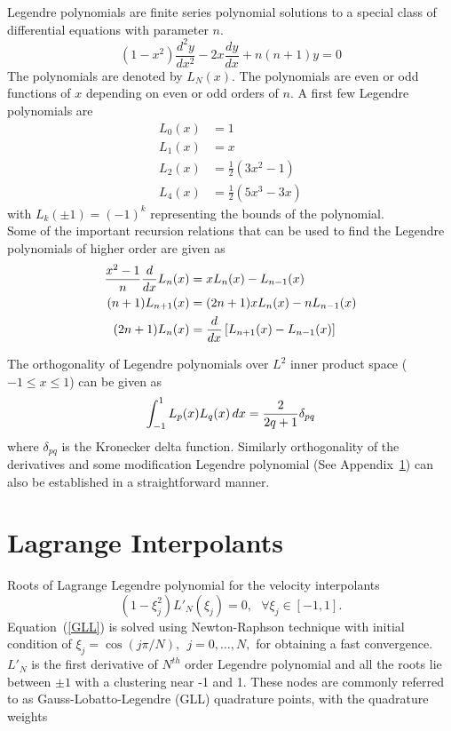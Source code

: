 Legendre polynomials are finite series polynomial solutions to a special class of differential equations with parameter $n$.
\begin{equation}
(1-x^{2})\frac{d^{2}y}{dx^{2}} -2x\frac{dy}{dx} + n(n+1)y = 0
\end{equation}
The polynomials are denoted by $L_{N}(x)$. The polynomials are even or odd functions of $x$ depending on even or odd orders of $n$. A first few Legendre polynomials are 
\begin{align*}
L_{0}(x) & = 1 \\
L_{1}(x) & = x \\
L_{2}(x) & = \frac{1}{2}(3x^2 - 1) \\
L_{4}(x) & = \frac{1}{2}(5x^3 - 3x)
\end{align*}
with $L_k(\pm 1) = (-1)^k$ representing the bounds of the polynomial.\\
Some of the important recursion relations that can be used to find the Legendre polynomials of higher order are given as
\begin{align}
{x^2-1 \over n} {d \over dx} L_n(x) & = xL_n(x) - L_{n-1}(x) \\
(n+1) L_{n+1}(x) & = (2n+1) x L_n(x) - n L_{n-1}(x) \\
(2n+1) L_n(x) & = {d \over dx} \left[ L_{n+1}(x) - L_{n-1}(x) \right]
\end{align}

The orthogonality of Legendre polynomials over $L^{2}$ inner product space ($-1 \le x \le 1$) can be given as
\begin{equation}
\int_{-1}^{1} L_p(x) L_q(x)\,dx = {2 \over {2q + 1}} \delta_{pq}
\end{equation}
where $\delta_{pq}$ is the Kronecker delta function.
Similarly orthogonality of the derivatives and  some modification Legendre polynomial (See Appendix~\ref{lagintp}) can also be established in a straightforward manner.
\section{Lagrange Interpolants}\label{lagintp}
  Roots of Lagrange Legendre polynomial for the velocity interpolants
\begin{equation}
(1-\xi_j^{2})L'_{N}(\xi_j) = 0, \ \ \ \forall \xi_j \in [-1,1]. \label{GLL}
\end{equation}
 Equation~(\ref{GLL}) is solved using Newton-Raphson technique with initial condition of $\xi_j = \cos(j\pi/N), \ \ j = 0,\ldots, N,$ for obtaining a fast convergence. $L'_{N}$ is the first derivative of $N^{th}$ order Legendre polynomial and all the roots lie between $\pm 1$ with a clustering near -1 and 1. These nodes are commonly referred to as Gauss-Lobatto-Legendre (GLL) quadrature points, with the quadrature weights
 
